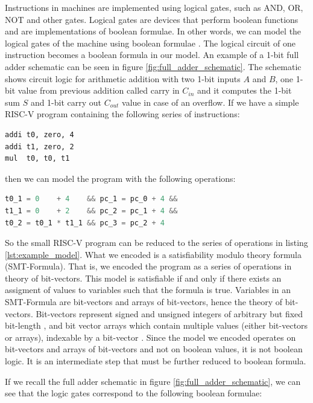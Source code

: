 \documentclass[12pt]{article}
\begin{document}
Instructions in machines are implemented using logical gates, such as AND, OR,
NOT and other gates. Logical gates are devices that perform boolean functions 
and are implementations of boolean formulae. In other words, we can model the
logical gates of the machine using boolean formulae \cite{page2009practical}.
The logical circuit of one instruction becomes a boolean formula in our model.
An example of a 1-bit full adder schematic can be seen in figure
\ref{fig:full_adder_schematic}. The schematic shows circuit logic for
arithmetic addition with two 1-bit inputs $A$ and $B$, one 1-bit value from
previous addition called carry in $C_{in}$ and it computes the 1-bit sum $S$
and 1-bit carry out $C_{out}$ value in case of an overflow. If we have a simple
RISC-V program containing the following series of instructions:
\begin{lstlisting}[language={[RISC-V]Assembler}, label=lst:example_riscv_program]
addi t0, zero, 4
addi t1, zero, 2
mul  t0, t0, t1
\end{lstlisting}
then we can model the program with the following operations:
\begin{lstlisting}[language=C, label=lst:example_model, caption=Example model, captionpos=b]
t0_1 = 0    + 4    && pc_1 = pc_0 + 4 &&
t1_1 = 0    + 2    && pc_2 = pc_1 + 4 &&
t0_2 = t0_1 * t1_1 && pc_3 = pc_2 + 4 
\end{lstlisting}

So the small RISC-V program can be reduced to the series of operations in
listing \ref{lst:example_model}. What we encoded is a satisfiability modulo
theory formula (SMT-Formula). That is, we encoded the program as a series of
operations in theory of bit-vectors. This model is satisfiable if and only if
there exists an assigment of values to variables such that the formula is true.
Variables in an SMT-Formula are bit-vectors and arrays of bit-vectors, hence
the theory of bit-vectors. Bit-vectors represent signed and unsigned integers
of arbitrary but fixed bit-length \cite{de2009satisfiability}, and bit vector
arrays which contain multiple values (either bit-vectors or arrays), indexable
by a bit-vector \cite{btor2}. Since the model we encoded operates on
bit-vectors and arrays of bit-vectors and not on boolean values, it is not
boolean logic. It is an intermediate step that must be further reduced to
boolean formula.

If we recall the full adder schematic in figure \ref{fig:full_adder_schematic},
we can see that the logic gates correspond to the following boolean formulae:
\end{document}
